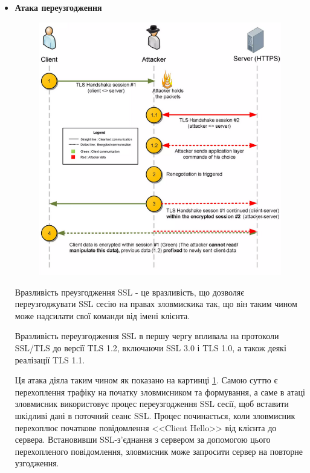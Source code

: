 \begin{itemize}
\item \textbf{Атака переузгодження}

    \begin{figure}[ht]
        \centering
        \includegraphics[scale=0.35]{../IMAGES/renegotiation.png}
        \label{regenetiation_attack}
    \end{figure}

    Вразливість преузгодження SSL - це вразливість, що дозволяє переузгоджувати SSL сесію на правах зловмискика так, що він таким чином може надсилати свої команди від імені клієнта.

    
    Вразливість переузгодження SSL в першу чергу впливала на протоколи SSL/TLS до версії TLS 1.2, включаючи SSL 3.0 і TLS 1.0, а також деякі реалізації TLS 1.1.


    Ця атака діяла таким чином як показано на картинці \ref{regenetiation_attack}. Самою суттю є перехоплення трафіку на початку зловмисником та формування, а саме в атаці зловмисник використовує процес переузгодження SSL сесії, щоб вставити шкідливі дані в поточний сеанс SSL. Процес починається, коли зловмисник перехоплює початкове повідомлення <<Client Hello>> від клієнта до сервера. Встановивши SSL-з'єднання з сервером за допомогою цього перехопленого повідомлення, зловмисник може запросити сервер на повторне узгодження.



\end{itemize}
